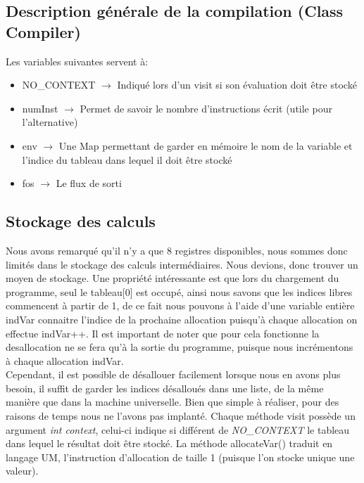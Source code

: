 \documentclass[a4paper,12pt]{report}
\begin{document}
\subsection{Description générale de la compilation (Class Compiler)}
Les variables suivantes servent à:
\begin{itemize}
 \item NO\_CONTEXT $\rightarrow$ Indiqué lors d'un visit si son évaluation doit être stocké
 \item numInst $\rightarrow$ Permet de savoir le nombre d'instructions écrit (utile pour l'alternative)
 \item env $\rightarrow$ Une Map permettant de garder en mémoire le nom de la variable et l'indice du tableau dans lequel il doit être
 stocké
 \item fos $\rightarrow$ Le flux de sorti
\end{itemize}

\subsection{Stockage des calculs}
Nous avons remarqué qu'il n'y a que 8 registres disponibles, nous sommes donc limités dans le stockage des calculs intermédiaires. Nous
devions, donc trouver un moyen de stockage. Une propriété intéressante est que lors du chargement du programme, seul le tableau[0] est occupé,
ainsi nous savons que les indices libres commencent à partir de 1, de ce fait nous pouvons à l'aide d'une variable entière indVar 
connaitre l'indice de la prochaine allocation puisqu'à chaque allocation on effectue indVar++. Il est important de noter que pour cela 
fonctionne la desallocation ne se fera qu'à la sortie du programme, puisque nous incrémentons à chaque allocation indVar. \\
Cependant, il est possible de désallouer facilement lorsque nous en avons plus besoin, il suffit de garder les indices désalloués dans
une liste, de la même manière que dans la machine universelle. Bien que simple à réaliser, pour des raisons de temps nous ne l'avons pas implanté.
Chaque méthode visit possède un argument \textit{int context}, celui-ci indique si différent de \textit{NO\_CONTEXT} le tableau 
dans lequel le résultat doit être stocké.
La méthode allocateVar() traduit en langage UM, l'instruction d'allocation de taille 1 (puisque l'on stocke unique une valeur).
\end{document}
